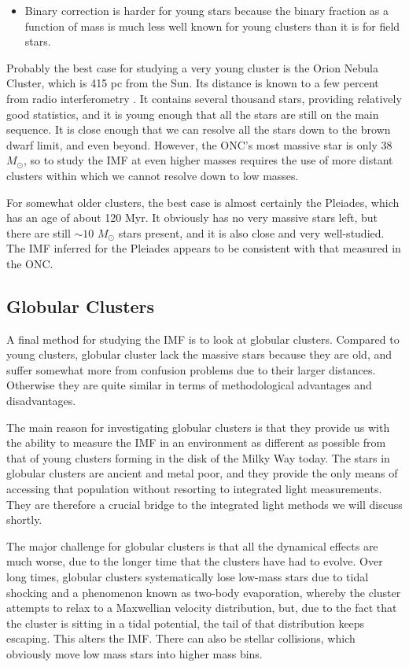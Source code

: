 \begin{itemize}
\item Binary correction is harder for young stars because the binary fraction as a function of mass is much less well known for young clusters than it is for field stars.
\end{itemize}

Probably the best case for studying a very young cluster is the Orion Nebula Cluster, which is 415 pc from the Sun. Its distance is known to a few percent from radio interferometry \citep{sandstrom07a, menten07a, kim08a}. It contains several thousand stars, providing relatively good statistics, and it is young enough that all the stars are still on the main sequence. It is close enough that we can resolve all the stars down to the brown dwarf limit, and even beyond. However, the ONC's most massive star is only 38 $M_\odot$, so to study the IMF at even higher masses requires the use of more distant clusters within which we cannot resolve down to low masses. 

For somewhat older clusters, the best case is almost certainly the Pleiades, which has an age of about 120 Myr. It obviously has no very massive stars left, but there are still $\sim 10$ $M_\odot$ stars present, and it is also close and very well-studied. The IMF inferred for the Pleiades appears to be consistent with that measured in the ONC.

\subsection{Globular Clusters}

A final method for studying the IMF is to look at globular clusters. Compared to young clusters, globular cluster lack the massive stars because they are old, and suffer somewhat more from confusion problems due to their larger distances. Otherwise they are quite similar in terms of methodological advantages and disadvantages.

The main reason for investigating globular clusters is that they provide us with the ability to measure the IMF in an environment as different as possible from that of young clusters forming in the disk of the Milky Way today. The stars in globular clusters are ancient and metal poor, and they provide the only means of accessing that population without resorting to integrated light measurements. They are therefore a crucial bridge to the integrated light methods we will discuss shortly.

The major challenge for globular clusters is that all the dynamical effects are much worse, due to the longer time that the clusters have had to evolve. Over long times, globular clusters systematically lose low-mass stars due to tidal shocking and a phenomenon known as two-body evaporation, whereby the cluster attempts to relax to a Maxwellian velocity distribution, but, due to the fact that the cluster is sitting in a tidal potential, the tail of that distribution keeps escaping. This alters the IMF. There can also be stellar collisions, which obviously move low mass stars into higher mass bins.

